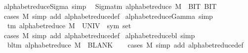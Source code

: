 \begin{isabellebody}
\ alphabet{\isacharunderscore}{\kern0pt}reduce{\isacharunderscore}{\kern0pt}Sigma\ {\isacharbrackleft}{\kern0pt}simp{\isacharbrackright}{\kern0pt}{\isacharcolon}{\kern0pt}\isanewline
\ \ {\isachardoublequoteopen}Sigma{\isacharunderscore}{\kern0pt}tm\ {\isacharparenleft}{\kern0pt}alphabet{\isacharunderscore}{\kern0pt}reduce\ M{\isacharparenright}{\kern0pt}\ {\isacharequal}{\kern0pt}\ {\isacharbraceleft}{\kern0pt}BIT{}{\isacharcomma}{\kern0pt}\ BIT{}{\isacharbraceright}{\kern0pt}{\isachardoublequoteclose}\isanewline
%
\isadelimproof
\ \ %
\endisadelimproof
%
\isatagproof
{}\isamarkupfalse%
\ {\isacharparenleft}{\kern0pt}cases\ M{\isacharparenright}{\kern0pt}\ {\isacharparenleft}{\kern0pt}simp\ add{\isacharcolon}{\kern0pt}\ alphabet{\isacharunderscore}{\kern0pt}reduce{\isacharunderscore}{\kern0pt}def{\isacharparenright}{\kern0pt}%
\endisatagproof
{\isafoldproof}%
%
\isadelimproof
\isanewline
%
\endisadelimproof
\isanewline
{}\isamarkupfalse%
\ alphabet{\isacharunderscore}{\kern0pt}reduce{\isacharunderscore}{\kern0pt}Gamma\ {\isacharbrackleft}{\kern0pt}simp{\isacharbrackright}{\kern0pt}{\isacharcolon}{\kern0pt}\isanewline
\ \ {\isachardoublequoteopen}{\isasymGamma}{\isacharunderscore}{\kern0pt}tm\ {\isacharparenleft}{\kern0pt}alphabet{\isacharunderscore}{\kern0pt}reduce\ M{\isacharparenright}{\kern0pt}\ {\isacharequal}{\kern0pt}\ {\isacharparenleft}{\kern0pt}UNIV\ {\isacharcolon}{\kern0pt}{\isacharcolon}{\kern0pt}\ sym{}\ set{\isacharparenright}{\kern0pt}{\isachardoublequoteclose}\isanewline
%
\isadelimproof
\ \ %
\endisadelimproof
%
\isatagproof
{}\isamarkupfalse%
\ {\isacharparenleft}{\kern0pt}cases\ M{\isacharparenright}{\kern0pt}\ {\isacharparenleft}{\kern0pt}simp\ add{\isacharcolon}{\kern0pt}\ alphabet{\isacharunderscore}{\kern0pt}reduce{\isacharunderscore}{\kern0pt}def{\isacharparenright}{\kern0pt}%
\endisatagproof
{\isafoldproof}%
%
\isadelimproof
\isanewline
%
\endisadelimproof
\isanewline
{}\isamarkupfalse%
\ alphabet{\isacharunderscore}{\kern0pt}reduce{\isacharunderscore}{\kern0pt}bl\ {\isacharbrackleft}{\kern0pt}simp{\isacharbrackright}{\kern0pt}{\isacharcolon}{\kern0pt}\isanewline
\ \ {\isachardoublequoteopen}bl{\isacharunderscore}{\kern0pt}tm\ {\isacharparenleft}{\kern0pt}alphabet{\isacharunderscore}{\kern0pt}reduce\ M{\isacharparenright}{\kern0pt}\ {\isacharequal}{\kern0pt}\ BLANK{}{\isachardoublequoteclose}\isanewline
%
\isadelimproof
\ \ %
\endisadelimproof
%
\isatagproof
{}\isamarkupfalse%
\ {\isacharparenleft}{\kern0pt}cases\ M{\isacharparenright}{\kern0pt}\ {\isacharparenleft}{\kern0pt}simp\ add{\isacharcolon}{\kern0pt}\ alphabet{\isacharunderscore}{\kern0pt}reduce{\isacharunderscore}{\kern0pt}def{\isacharparenright}{\kern0pt}%

\end{isabellebody}

